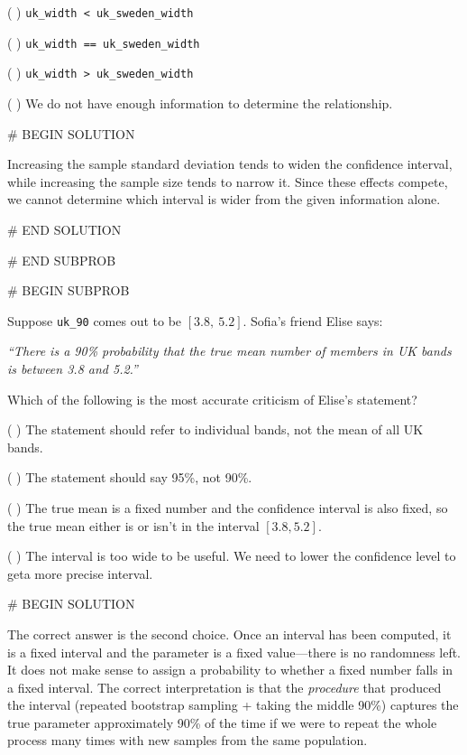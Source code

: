 \documentclass[twoside,12pt]{article}
\begin{document}
{\begin{enumerate}
\medskip
( ) \texttt{uk\_width < uk\_sweden\_width}

\smallskip
( ) \texttt{uk\_width == uk\_sweden\_width}

\smallskip
( ) \texttt{uk\_width > uk\_sweden\_width}

\smallskip
( ) We do not have enough information to determine the relationship.

# BEGIN SOLUTION


Increasing the sample standard deviation tends to widen the confidence interval, while increasing the sample size tends to narrow it. Since these effects compete, we cannot determine which interval is wider from the given information alone.


# END SOLUTION

\end{enumerate}



# END SUBPROB

\bigskip

# BEGIN SUBPROB


Suppose \texttt{uk\_90} comes out to be $[3.8,\ 5.2]$. Sofia's friend Elise says:

\smallskip

\textit{``There is a 90\% probability that the true mean number of members in UK bands is between 3.8 and 5.2.''}

\smallskip

Which of the following is the most accurate criticism of Elise's statement? 
 
\medskip
 
( ) The statement should refer to individual bands, not the mean of all UK bands.

\smallskip
 
( ) The statement should say 95\%, not 90\%.
 
\smallskip
 
( ) The true mean is a fixed number and the confidence interval is also fixed, so the \gap true mean either is or isn't in the interval $[3.8, 5.2]$.
 

\smallskip
 
( ) The interval is too wide to be useful. We need to lower the confidence level to get\gap a more precise interval.
 
# BEGIN SOLUTION


The correct answer is the second choice. Once an interval has been computed, it is a fixed interval and the parameter is a fixed value---there is no randomness left. It does not make sense to assign a probability to whether a fixed number falls in a fixed interval. The correct interpretation is that the \emph{procedure} that produced the interval (repeated bootstrap sampling + taking the middle 90\%) captures the true parameter approximately 90\% of the time if we were to repeat the whole process many times with new samples from the same population.


}
\end{document}
